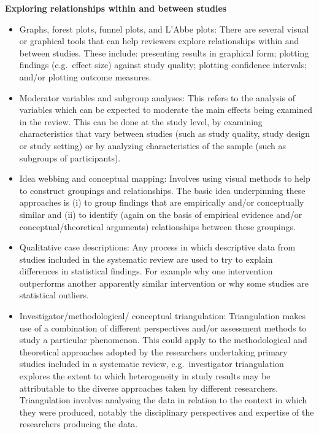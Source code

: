 \documentclass[
  10pt,
  a4paper,
  DIV=11,
  numbers=noendperiod]{scrreprt}
\begin{document}
\textbf{Exploring relationships within and between studies}

\begin{itemize}
\item
  Graphs, forest plots, funnel plots, and L'Abbe plots: There are
  several visual or graphical tools that can help reviewers explore
  relationships within and between studies. These include: presenting
  results in graphical form; plotting findings (e.g.~effect size)
  against study quality; plotting confidence intervals; and/or plotting
  outcome measures.
\item
  Moderator variables and subgroup analyses: This refers to the analysis
  of variables which can be expected to moderate the main effects being
  examined in the review. This can be done at the study level, by
  examining characteristics that vary between studies (such as study
  quality, study design or study setting) or by analyzing
  characteristics of the sample (such as subgroups of participants).
\item
  Idea webbing and conceptual mapping: Involves using visual methods to
  help to construct groupings and relationships. The basic idea
  underpinning these approaches is (i) to group findings that are
  empirically and/or conceptually similar and (ii) to identify (again on
  the basis of empirical evidence and/or conceptual/theoretical
  arguments) relationships between these groupings.
\item
  Qualitative case descriptions: Any process in which descriptive data
  from studies included in the systematic review are used to try to
  explain differences in statistical findings. For example why one
  intervention outperforms another apparently similar intervention or
  why some studies are statistical outliers.
\item
  Investigator/methodological/ conceptual triangulation: Triangulation
  makes use of a combination of different perspectives and/or assessment
  methods to study a particular phenomenon. This could apply to the
  methodological and theoretical approaches adopted by the researchers
  undertaking primary studies included in a systematic review,
  e.g.~investigator triangulation explores the extent to which
  heterogeneity in study results may be attributable to the diverse
  approaches taken by different researchers. Triangulation involves
  analysing the data in relation to the context in which they were
  produced, notably the disciplinary perspectives and expertise of the
  researchers producing the data.
\end{itemize}
\end{document}
